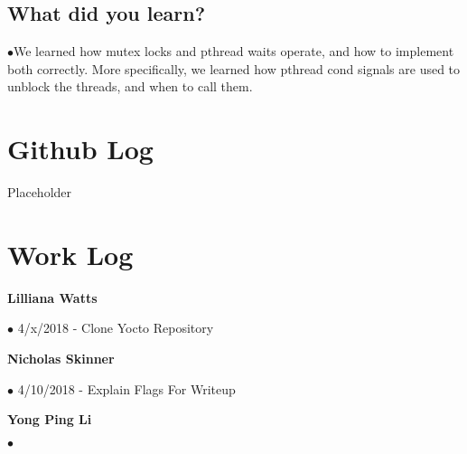 \documentclass[letterpaper,10pt,fleqn,draftclsnofoot,onecolumn]{IEEEtran}
\begin{document}
	
	\subsection{What did you learn?}
	$\bullet$We learned how mutex locks and pthread waits operate, and how to implement both correctly. More specifically, we learned how pthread cond signals are used to unblock the threads, and when to call them.  
	\section*{ Github Log }
	Placeholder
	
	\section*{Work Log}
		{\bf Lilliana Watts}
		
		$\bullet$ 4/x/2018 - Clone Yocto Repository
		
		{\bf Nicholas Skinner}
		
		$\bullet$ 4/10/2018 - Explain Flags For Writeup
		
		{\bf Yong Ping Li}
		
		$\bullet$
		
		
		
	
\end{document}
